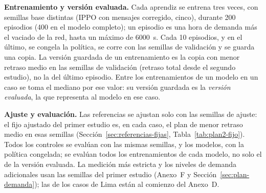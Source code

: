 \noindent\textbf{Entrenamiento y versión evaluada.} Cada aprendiz se
entrena tres veces, con semillas base distintas (IPPO con mensajes
corregido, cinco), durante 200 episodios (400 en el modelo completo);
un episodio es una hora de demanda más el vaciado de la red, hasta un
máximo de 6000~s. Cada 10 episodios, y en el último, se congela la
política, se corre con las semillas de validación y se guarda una
copia. La versión
guardada de un entrenamiento es la copia con menor retraso medio en las
semillas de validación (retraso total desde el segundo estudio), no la
del último episodio. Entre los entrenamientos de un modelo en un caso se
toma el mediano por ese valor: su versión guardada es la \emph{versión
evaluada}, la que representa al modelo en ese caso.

\noindent\textbf{Ajuste y evaluación.} Las referencias se ajustan solo
con las semillas de ajuste: el fijo ajustado del primer estudio es, en
cada caso, el plan de menor retraso medio en esas semillas
(Sección~\ref{sec:referencias-fijas}, Tabla~\ref{tab:plan2-fijo}).
Todos los controles se evalúan con las mismas semillas, y los modelos,
con la política congelada; se evalúan todos los entrenamientos de cada
modelo, no solo el de la versión evaluada. La medición más estricta y
los niveles de demanda adicionales usan las semillas del primer estudio
(Anexo~F y Sección~\ref{sec:plan-demanda}); las de los casos de Lima
están al comienzo del Anexo~D.


